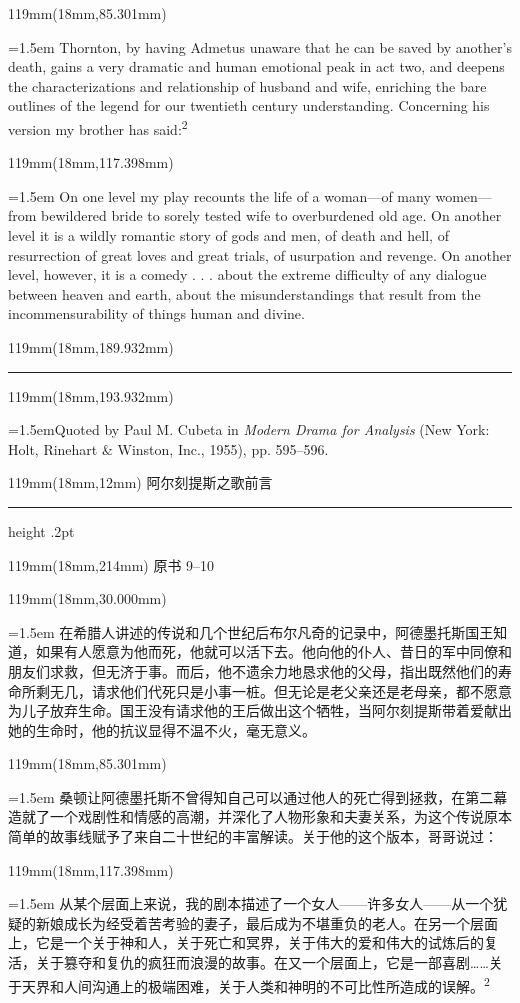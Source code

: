 \documentclass{article}
\newcommand{\ENsetup}{\normalfont\color{ink}\fontsize{11}{16.5}\selectfont\emergencystretch=1.5em}
\newcommand{\ZHsetup}{\normalfont\color{ink}\fontsize{10.5}{17}\selectfont\emergencystretch=1.5em}
\newcommand{\Note}[2]{\par\hangindent=1.5em\hangafter=1\noindent\makebox[1.5em][l]{#1}#2\par}
\newcommand{\Block}[3]{\begin{textblock*}{119mm}(18mm,#1mm){#2 #3\par}\end{textblock*}}
\newcommand{\Heading}[3]{%
  \begin{textblock*}{119mm}(18mm,12mm)
    \color{quiet}\fontsize{7.5}{10}\selectfont
    #1\hfill #2\par\vspace{3mm}\hrule height .2pt
  \end{textblock*}
  \begin{textblock*}{119mm}(18mm,214mm)
    \color{quiet}\fontsize{7}{10}\selectfont #3\hfill\thepage
  \end{textblock*}
}
\begin{document}
\Block{85.301}{\ENsetup}{Thornton, by having Admetus unaware that he can be saved by another's death, gains a very dramatic and human emotional peak in act two, and deepens the characterizations and relationship of husband and wife, enriching the bare outlines of the legend for our twentieth century understanding. Concerning his version my brother has said:\textsuperscript{2}\par}
\Block{117.398}{\ENsetup}{\leftskip=4mm\rightskip=3mm 
On one level my play recounts the life of a woman—of many women—from bewildered bride to sorely tested wife to overburdened old age. On another level it is a wildly romantic story of gods and men, of death and hell, of resurrection of great loves and great trials, of usurpation and revenge. On another level, however, it is a comedy . . . about the extreme difficulty of any dialogue between heaven and earth, about the misunderstandings that result from the incommensurability of things human and divine.\par}
\begin{textblock*}{119mm}(18mm,189.932mm)\color{ink}\rule{30mm}{.25pt}\end{textblock*}
\begin{textblock*}{119mm}(18mm,193.932mm)\normalfont\color{ink}\fontsize{7.5}{11}\selectfont \Note{2}{Quoted by Paul M. Cubeta in \textit{Modern Drama for Analysis} (New York: Holt, Rinehart \& Winston, Inc., 1955), pp. 595–596.}\end{textblock*}
\newpage
\null
\Heading{阿尔刻提斯之歌}{前言}{原书 9–10}
\Block{30.000}{\ZHsetup}{在希腊人讲述的传说和几个世纪后布尔凡奇的记录中，阿德墨托斯国王知道，如果有人愿意为他而死，他就可以活下去。他向他的仆人、昔日的军中同僚和朋友们求救，但无济于事。而后，他不遗余力地恳求他的父母，指出既然他们的寿命所剩无几，请求他们代死只是小事一桩。但无论是老父亲还是老母亲，都不愿意为儿子放弃生命。国王没有请求他的王后做出这个牺牲，当阿尔刻提斯带着爱献出她的生命时，他的抗议显得不温不火，毫无意义。\par }
\Block{85.301}{\ZHsetup}{桑顿让阿德墨托斯不曾得知自己可以通过他人的死亡得到拯救，在第二幕造就了一个戏剧性和情感的高潮，并深化了人物形象和夫妻关系，为这个传说原本简单的故事线赋予了来自二十世纪的丰富解读。关于他的这个版本，哥哥说过：\par }
\Block{117.398}{\ZHsetup}{\leftskip=4mm\rightskip=3mm\kai 从某个层面上来说，我的剧本描述了一个女人——许多女人——从一个犹疑的新娘成长为经受着苦考验的妻子，最后成为不堪重负的老人。在另一个层面上，它是一个关于神和人，关于死亡和冥界，关于伟大的爱和伟大的试炼后的复活，关于篡夺和复仇的疯狂而浪漫的故事。在又一个层面上，它是一部喜剧……关于天界和人间沟通上的极端困难，关于人类和神明的不可比性所造成的误解。\textsuperscript{2}\par }
\end{document}
